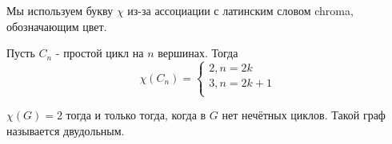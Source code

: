\begin{note}
	Мы используем букву $\chi$ из-за ассоциации с латинским словом chroma, обозначающим цвет.
\end{note}

\begin{example}
Пусть $C_n$ - простой цикл на $n$ вершинах. Тогда \[ \chi(C_n) = \begin{cases}
    2, n=2k\\
    3, n = 2k + 1\\
\end{cases}\]

\end{example}

\begin{proposition}
$\chi(G) = 2$ тогда и только тогда, когда в $G$ нет нечётных циклов. Такой граф называется двудольным.
\end{proposition}